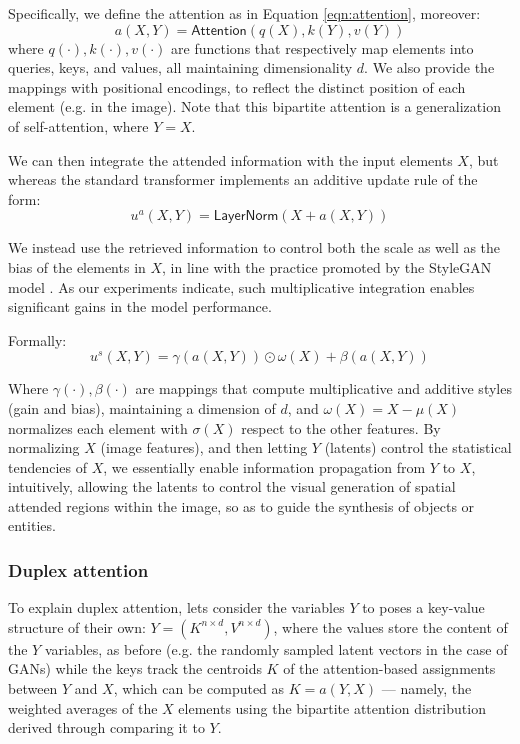 \documentclass{article}
\begin{document}
	Specifically, we define the attention as in Equation \eqref{eqn:attention}, moreover:
	\begin{equation}
		\label{eqn:attention2}
		a(X,Y)=\mathsf{Attention}(q(X), k(Y), v(Y))
	\end{equation}
	where $q(\cdot), k(\cdot), v(\cdot)$ are functions that respectively map elements into queries, 
	keys, and values, all maintaining dimensionality $d$. We also provide the mappings with positional 
	encodings, to reflect the distinct position of each element (e.g. in the image). Note that this bipartite 
	attention is a generalization of self-attention, where $Y = X$.
	
	We can then integrate the attended information with the input elements $X$, but whereas the 
	standard transformer implements an additive update rule of the form:
	\begin{equation}
		\label{eqn:layernorm}
		u^a(X, Y )=\mathsf{LayerNorm}(X + a(X, Y ))
	\end{equation}
	
	We instead use the retrieved information to control both the scale as well as the bias of the 
	elements 
	in $X$, in line with the practice promoted by the StyleGAN model \cite{karras2019style}. As our 
	experiments indicate, such multiplicative integration enables significant gains in the model 
	performance. 
	
	Formally:
	\begin{equation}
		\label{eqn:simplex}
		u^s(X, Y )=\gamma (a(X, Y )) \odot \omega (X) + \beta (a(X, Y ))
	\end{equation}

	Where $\gamma(\cdot), \beta(\cdot)$ are mappings that compute multiplicative and additive styles 
	(gain and bias), maintaining a dimension of $d$, and $\omega (X) = X- \mu(X)$ normalizes each 
	element with $\sigma(X)$ respect to the other features. By normalizing $X$ (image features), and 
	then letting $Y$ (latents) control the statistical tendencies of $X$, we essentially enable information 
	propagation from $Y$ to $X$, intuitively, allowing the latents to control the visual generation of 
	spatial attended regions within the image, so as to guide the synthesis of objects or entities.
	
	\subsubsection{Duplex attention}%
	To explain duplex attention, lets consider the variables $Y$ to poses a key-value structure of their 
	own: $Y = (K^{n\times d} , V^{n\times d})$, where the values store the content of the $Y$ variables, 
	as before (e.g. the randomly sampled latent vectors in the case of GANs) while the keys track the 
	centroids $K$ of the attention-based assignments between $Y$ and $X$, which can be computed 
	as $K = a(Y, X)$ — namely, the weighted averages of the $X$ elements using the bipartite attention 
	distribution derived through comparing it to $Y$. 
	
\end{document}

